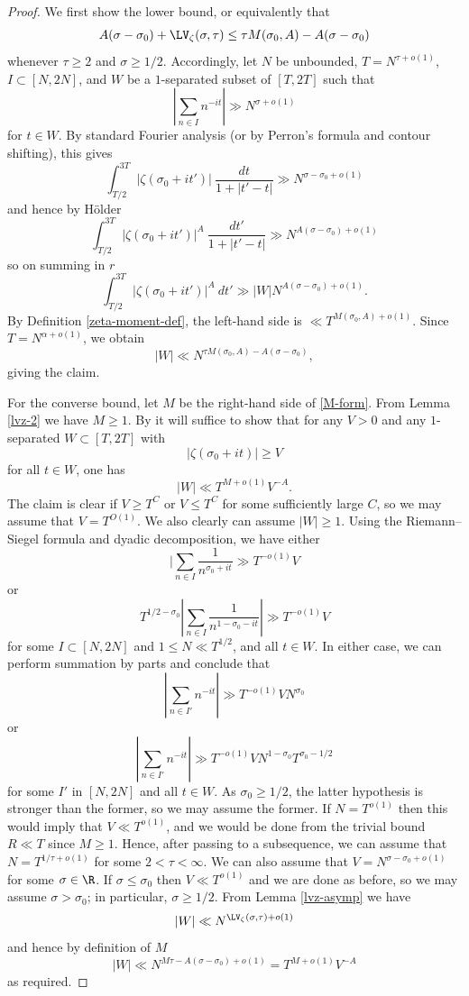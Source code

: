 \begin{proof}  We first show the lower bound, or equivalently that
$$ A(\sigma-\sigma_0) + \LV_\zeta(\sigma,\tau) \leq \tau M(\sigma_0,A) - A(\sigma-\sigma_0)$$
whenever $\tau \geq 2$ and $\sigma \geq 1/2$.  Accordingly, let $N$ be unbounded, $T = N^{\tau+o(1)}$, $I \subset [N,2N]$, and $W$ be a $1$-separated subset of $[T,2T]$ such that
$$ |\sum_{n \in I} n^{-it}| \gg N^{\sigma+o(1)}$$
for $t \in W$. By standard Fourier analysis (or by Perron's formula and contour shifting), this gives
$$ \int_{T/2}^{3T} |\zeta(\sigma_0+it')|\ \frac{dt}{1+|t'-t|} \gg N^{\sigma - \sigma_0 + o(1)}$$
and hence by H\"older
$$ \int_{T/2}^{3T} |\zeta(\sigma_0+it')|^A\ \frac{dt'}{1+|t'-t|} \gg N^{A(\sigma - \sigma_0) + o(1)}$$
so on summing in $r$
$$ \int_{T/2}^{3T} |\zeta(\sigma_0+it')|^A\ dt' \gg |W| N^{A(\sigma - \sigma_0) + o(1)}.$$
By Definition \ref{zeta-moment-def}, the left-hand side is $\ll T^{M(\sigma_0,A)+o(1)}$.  Since $T = N^{\alpha+o(1)}$, we obtain
$$ |W| \ll N^{\tau M(\sigma_0,A) - A(\sigma-\sigma_0)},$$
giving the claim.

For the converse bound, let $M$ be the right-hand side of \eqref{M-form}.  From Lemma \ref{lvz-2} we have $M \geq 1$. By \cite[\S 8.1]{ivic} it will suffice to show that for any $V>0$ and any $1$-separated $W \subset [T,2T]$ with
$$ |\zeta(\sigma_0+it)| \geq V$$
for all $t \in W$, one has
$$ |W| \ll T^{M+o(1)} V^{-A}.$$
The claim is clear if $V \geq T^C$ or $V \leq T^C$ for some sufficiently large $C$, so we may assume that $V = T^{O(1)}$.  We also clearly can assume $|W|\geq 1$.  Using the Riemann--Siegel formula \cite[Theorem 4.1]{ivic} and dyadic decomposition, we have either
$$ |\sum_{n \in I} \frac{1}{n^{\sigma_0+it}} \gg T^{-o(1)} V$$
or
$$ T^{1/2-\sigma_0} |\sum_{n \in I} \frac{1}{n^{1-\sigma_0-it}}| \gg T^{-o(1)} V$$
for some $I \subset [N,2N]$ and $1 \leq N \ll T^{1/2}$, and all $t \in W$.  In either case, we can perform summation by parts and conclude that
$$ |\sum_{n \in I'} n^{-it}|\gg T^{-o(1)} V N^{\sigma_0}$$
or
$$ |\sum_{n \in I'} n^{-it}|\gg T^{-o(1)} V N^{1-\sigma_0} T^{\sigma_0-1/2}$$
for some $I'$ in $[N,2N]$ and all $t \in W$.  As $\sigma_0 \geq 1/2$, the latter hypothesis is stronger than the former, so we may assume the former.  If $N = T^{o(1)}$ then this would imply that $V \ll T^{o(1)}$, and we would be done from the trivial bound $R \ll T$ since $M \geq 1$.
Hence, after passing to a subsequence, we can assume that $N = T^{1/\tau+o(1)}$ for some $2 < \tau < \infty$.  We can also assume that $V = N^{\sigma-\sigma_0+o(1)}$ for some $\sigma \in \R$. If $\sigma \leq \sigma_0$ then $V \ll T^{o(1)}$ and we are done as before, so we may assume $\sigma > \sigma_0$; in particular, $\sigma \geq 1/2$.  From Lemma \ref{lvz-asymp} we have
$$ |W| \ll N^{\LV_\zeta(\sigma,\tau)+o(1)}$$
and hence by definition of $M$
$$ |W| \ll N^{M \tau - A (\sigma-\sigma_0)+o(1)} = T^{M+o(1)} V^{-A}$$
as required.
\end{proof}

